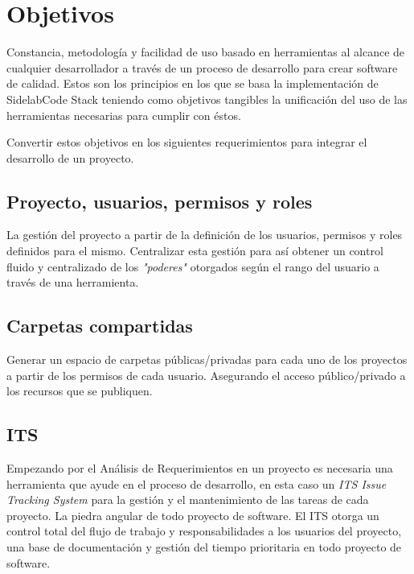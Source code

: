 
\chapter{Objetivos}
\label{chap:objetivos}

\par Constancia, metodolog\'ia y facilidad de uso basado en herramientas al alcance de cualquier desarrollador a trav\'es de un proceso de desarrollo para crear software de calidad. Estos son los principios en los que se basa la implementación de SidelabCode Stack teniendo como objetivos tangibles la unificación del uso de las herramientas necesarias para cumplir con éstos.

\par Convertir estos objetivos en los siguientes requerimientos para integrar el desarrollo de un proyecto.

\section{Proyecto, usuarios, permisos y roles }
\label{sec:proyecto-usuarios}

\par La gestión del proyecto a partir de la definición de los usuarios, permisos y roles definidos para el mismo. Centralizar esta gestión para así obtener un control fluido y centralizado de los \emph{"poderes"} otorgados según el rango del usuario a través de una herramienta.


\section{Carpetas compartidas}
\label{sec:carpetas-compartidas}

\par Generar un espacio de carpetas p\'ublicas/privadas para cada uno de los proyectos a partir de los permisos de cada usuario. Asegurando el acceso público/privado a los recursos que se publiquen.


\section{ITS}
\label{sec:its}

\par Empezando por el An\'alisis de Requerimientos en un proyecto es necesaria una herramienta que ayude en el proceso de desarrollo, en esta caso un \emph{ITS Issue Tracking System} para la gestión y el mantenimiento de las tareas de cada proyecto. La piedra angular de todo proyecto de software. El ITS otorga un control total del flujo de trabajo y responsabilidades a los usuarios del proyecto, una base de documentación y gestión del tiempo prioritaria en todo proyecto de software.

